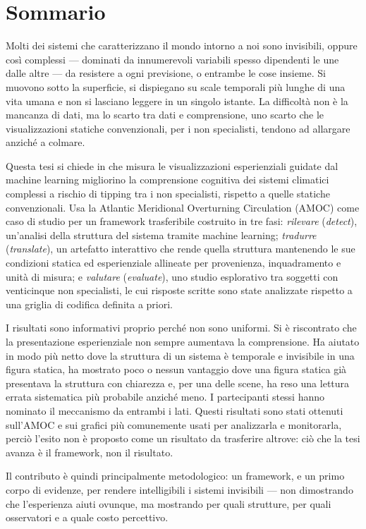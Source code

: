 
\chapter*{Sommario}

Molti dei sistemi che caratterizzano il mondo intorno a noi sono invisibili, oppure così complessi --- dominati da innumerevoli variabili spesso dipendenti le une dalle altre --- da resistere a ogni previsione, o entrambe le cose insieme. Si muovono sotto la superficie, si dispiegano su scale temporali più lunghe di una vita umana e non si lasciano leggere in un singolo istante. La difficoltà non è la mancanza di dati, ma lo scarto tra dati e comprensione, uno scarto che le visualizzazioni statiche convenzionali, per i non specialisti, tendono ad allargare anziché a colmare.

Questa tesi si chiede in che misura le visualizzazioni esperienziali guidate dal machine learning migliorino la comprensione cognitiva dei sistemi climatici complessi a rischio di tipping tra i non specialisti, rispetto a quelle statiche convenzionali. Usa la Atlantic Meridional Overturning Circulation (AMOC) come caso di studio per un framework trasferibile costruito in tre fasi: \emph{rilevare} (\emph{detect}), un'analisi della struttura del sistema tramite machine learning; \emph{tradurre} (\emph{translate}), un artefatto interattivo che rende quella struttura mantenendo le sue condizioni statica ed esperienziale allineate per provenienza, inquadramento e unità di misura; e \emph{valutare} (\emph{evaluate}), uno studio esplorativo tra soggetti con venticinque non specialisti, le cui risposte scritte sono state analizzate rispetto a una griglia di codifica definita a priori.

I risultati sono informativi proprio perché non sono uniformi. Si è riscontrato che la presentazione esperienziale non sempre aumentava la comprensione. Ha aiutato in modo più netto dove la struttura di un sistema è temporale e invisibile in una figura statica, ha mostrato poco o nessun vantaggio dove una figura statica già presentava la struttura con chiarezza e, per una delle scene, ha reso una lettura errata sistematica più probabile anziché meno. I partecipanti stessi hanno nominato il meccanismo da entrambi i lati. Questi risultati sono stati ottenuti sull'AMOC e sui grafici più comunemente usati per analizzarla e monitorarla, perciò l'esito non è proposto come un risultato da trasferire altrove: ciò che la tesi avanza è il framework, non il risultato.

Il contributo è quindi principalmente metodologico: un framework, e un primo corpo di evidenze, per rendere intelligibili i sistemi invisibili --- non dimostrando che l'esperienza aiuti ovunque, ma mostrando per quali strutture, per quali osservatori e a quale costo percettivo.

\cleardoublepage
